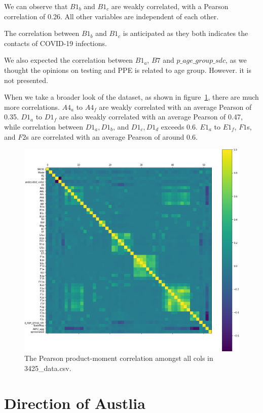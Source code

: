 \documentclass[11pt,twocolumn,letterpaper]{article}
\begin{document}
We can observe that $B1_b$ and $B1_c$ are weakly correlated, with a Pearson correlation of 0.26.
All other variables are independent of each other.

The correlation between $B1_b$ and $B1_c$ is anticipated as they both indicates the contacts of COVID-19 infections.

We also expected the correlation between $B1_a$, $B7$ and $p\_age\_group\_sdc$, as we thought the opinions on testing and PPE is related to age group.
However. it is not presented.

When we take a broader look of the dataset, as shown in figure~\ref{fig:all}, there are much more correlations.
$A4_a$ to $A4_f$ are weakly correlated with an average Pearson of 0.35.
$D1_a$ to $D1_f$ are also weakly correlated with an average Pearson of 0.47, while correlation between $D1_a, D1_b$, and $D1_c, D1_d$ exceeds 0.6.
$E1_a$ to $E1_f$, $F1$s, and $F2$s are correlated with an average Pearson of around
0.6.

\begin{figure}[htb]
    \centering
    \includegraphics[width=1\linewidth]{assests/all.png}
    \caption{The Pearson product-moment correlation amongst all cols in 3425\_data.csv.}
    \label{fig:all}\vspace{-2.5mm}
\end{figure}

\section{Direction of Austlia}\label{direction}
\end{document}
